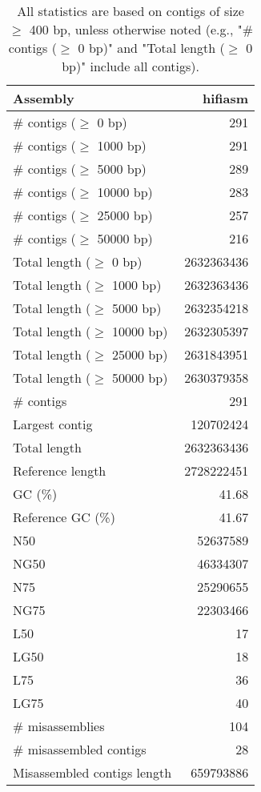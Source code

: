 \documentclass[12pt,a4paper]{article}
\begin{document}
\begin{table}[ht]
\begin{center}
\caption{All statistics are based on contigs of size $\geq$ 400 bp, unless otherwise noted (e.g., "\# contigs ($\geq$ 0 bp)" and "Total length ($\geq$ 0 bp)" include all contigs).}
\begin{tabular}{|l*{1}{|r}|}
\hline
Assembly & hifiasm \\ \hline
\# contigs ($\geq$ 0 bp) & 291 \\ \hline
\# contigs ($\geq$ 1000 bp) & 291 \\ \hline
\# contigs ($\geq$ 5000 bp) & 289 \\ \hline
\# contigs ($\geq$ 10000 bp) & 283 \\ \hline
\# contigs ($\geq$ 25000 bp) & 257 \\ \hline
\# contigs ($\geq$ 50000 bp) & 216 \\ \hline
Total length ($\geq$ 0 bp) & 2632363436 \\ \hline
Total length ($\geq$ 1000 bp) & 2632363436 \\ \hline
Total length ($\geq$ 5000 bp) & 2632354218 \\ \hline
Total length ($\geq$ 10000 bp) & 2632305397 \\ \hline
Total length ($\geq$ 25000 bp) & 2631843951 \\ \hline
Total length ($\geq$ 50000 bp) & 2630379358 \\ \hline
\# contigs & 291 \\ \hline
Largest contig & 120702424 \\ \hline
Total length & 2632363436 \\ \hline
Reference length & 2728222451 \\ \hline
GC (\%) & 41.68 \\ \hline
Reference GC (\%) & 41.67 \\ \hline
N50 & 52637589 \\ \hline
NG50 & 46334307 \\ \hline
N75 & 25290655 \\ \hline
NG75 & 22303466 \\ \hline
L50 & 17 \\ \hline
LG50 & 18 \\ \hline
L75 & 36 \\ \hline
LG75 & 40 \\ \hline
\# misassemblies & 104 \\ \hline
\# misassembled contigs & 28 \\ \hline
Misassembled contigs length & 659793886 \\ \hline

\end{tabular}
\end{center}
\end{table}
\end{document}
